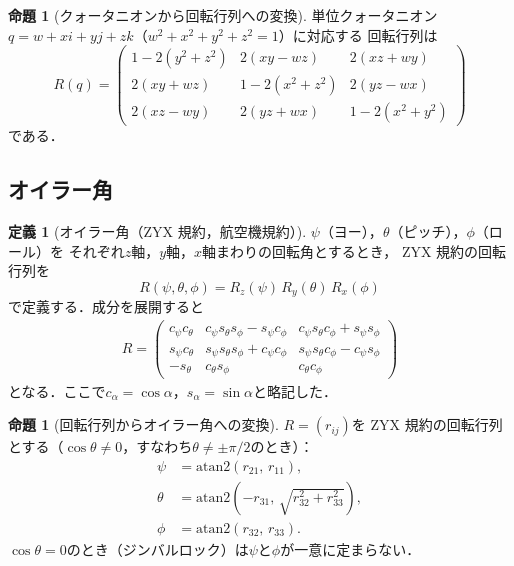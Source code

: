 \documentclass[dvipdfmx,a4paper,12pt]{jsarticle}
\theoremstyle{definition}
\newtheorem{definition}[theorem]{定義}
\newtheorem{proposition}[theorem]{命題}
\begin{document}
\begin{proposition}[クォータニオンから回転行列への変換]
    単位クォータニオン$q=w+xi+yj+zk$（$w^2+x^2+y^2+z^2=1$）に対応する
    回転行列は
    $$R(q)=\begin{pmatrix}
        1-2(y^2+z^2) & 2(xy-wz) & 2(xz+wy) \\
        2(xy+wz) & 1-2(x^2+z^2) & 2(yz-wx) \\
        2(xz-wy) & 2(yz+wx) & 1-2(x^2+y^2)
    \end{pmatrix}$$
    である．
\end{proposition}

\subsection{オイラー角}

\begin{definition}[オイラー角（ZYX 規約，航空機規約）]
    $\psi$（ヨー），$\theta$（ピッチ），$\phi$（ロール）を
    それぞれ$z$軸，$y$軸，$x$軸まわりの回転角とするとき，
    ZYX 規約の回転行列を
    $$R(\psi,\theta,\phi)=R_z(\psi)\,R_y(\theta)\,R_x(\phi)$$
    で定義する．成分を展開すると
    \begin{align*}
        R=\begin{pmatrix}
            c_\psi c_\theta
            & c_\psi s_\theta s_\phi - s_\psi c_\phi
            & c_\psi s_\theta c_\phi + s_\psi s_\phi \\
            s_\psi c_\theta
            & s_\psi s_\theta s_\phi + c_\psi c_\phi
            & s_\psi s_\theta c_\phi - c_\psi s_\phi \\
            -s_\theta
            & c_\theta s_\phi
            & c_\theta c_\phi
        \end{pmatrix}
    \end{align*}
    となる．ここで$c_\alpha=\cos\alpha$，$s_\alpha=\sin\alpha$と略記した．
\end{definition}

\begin{proposition}[回転行列からオイラー角への変換]
    $R=(r_{ij})$を ZYX 規約の回転行列とする（$\cos\theta\neq 0$，すなわち$\theta\neq\pm\pi/2$のとき）：
    \begin{align*}
        \psi &= \mathrm{atan2}(r_{21},\,r_{11}),\\
        \theta &= \mathrm{atan2}(-r_{31},\,\sqrt{r_{32}^2+r_{33}^2}),\\
        \phi &= \mathrm{atan2}(r_{32},\,r_{33}).
    \end{align*}
    $\cos\theta=0$のとき（ジンバルロック）は$\psi$と$\phi$が一意に定まらない．
\end{proposition}
\end{document}
